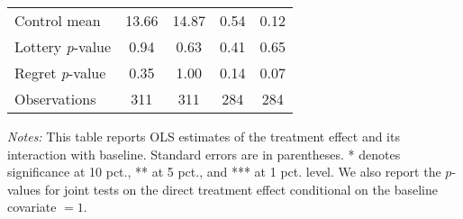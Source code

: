 \begin{table}[ht]
{\begin{threeparttable}
\begin{tabular}{l*{4}{c}}
Control mean    &    13.66         &    14.87         &     0.54         &     0.12         \\
Lottery \emph{p}-value&     0.94         &     0.63         &     0.41         &     0.65         \\
Regret \emph{p}-value&     0.35         &     1.00         &     0.14         &     0.07         \\
Observations    &      311         &      311         &      284         &      284         \\
\bottomrule \end{tabular} \begin{tablenotes}[flushleft] \footnotesize \item \emph{Notes:} This table reports OLS estimates of the treatment effect and its interaction with baseline. Standard errors are in parentheses. * denotes significance at 10 pct., ** at 5 pct., and *** at 1 pct. level. We also report the \(p\)-values for joint tests on the direct treatment effect conditional on the baseline covariate $= 1$. \end{tablenotes} \end{threeparttable} } \end{table}

